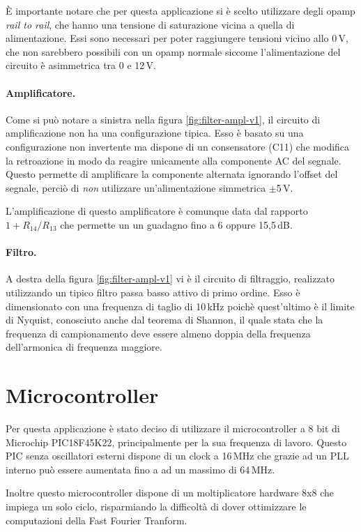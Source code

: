 \`E importante notare che per questa applicazione si \`e scelto utilizzare
degli opamp \emph{rail to rail}, che hanno una tensione di saturazione vicina
a quella di alimentazione. Essi sono necessari per poter raggiungere tensioni
vicino allo 0\,V, che non sarebbero possibili con un opamp normale siccome
l'alimentazione del circuito \`e asimmetrica tra 0 e 12\,V.

\paragraph{Amplificatore.} Come si pu\`o notare a sinistra nella figura
\ref{fig:filter-ampl-v1}, il circuito di amplificazione non ha una configurazione
tipica. Esso \`e basato su una configurazione non invertente ma dispone di un
consensatore (C11) che modifica la retroazione in modo da reagire unicamente
alla componente AC del segnale. Questo permette di amplificare la componente
alternata ignorando l'offset del segnale, perci\`o di \emph{non} utilizzare
un'alimentazione simmetrica \(\pm\)5\,V.

L'amplificazione di questo amplificatore \`e comunque data dal rapporto
\(1+R_{14}/R_{13}\) che permette un un guadagno fino a 6 oppure 15,5\,dB.

\paragraph{Filtro.} A destra della figura \ref{fig:filter-ampl-v1} vi \`e il
circuito di filtraggio, realizzato utilizzando un tipico filtro passa basso
attivo di primo ordine. Esso \`e dimensionato con una frequenza di taglio di
10\,kHz poich\`e quest'ultimo \`e il limite di Nyquist, conosciuto anche dal
teorema di Shannon, il quale stata che la frequenza di campionamento deve
essere almeno doppia della frequenza dell'armonica di frequenza maggiore.


\section{Microcontroller}
Per questa applicazione \`e stato deciso di utilizzare il microcontroller a 8
bit di Microchip PIC18F45K22, principalmente per la sua frequenza di lavoro.
Questo PIC senza oscillatori esterni dispone di un clock a 16\,MHz che grazie
ad un PLL interno pu\`o essere aumentata fino a ad un massimo di 64\,MHz.

Inoltre questo microcontroller dispone di un moltiplicatore hardware 8x8 che
impiega un solo ciclo, risparmiando la difficolt\`a di dover ottimizzare le
computazioni della Fast Fourier Tranform.

